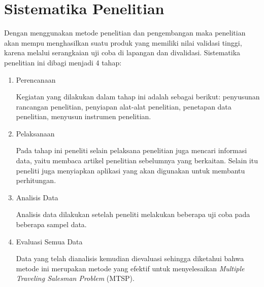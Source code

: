 \section{Sistematika Penelitian}

Dengan menggunakan metode penelitian dan pengembangan maka penelitian akan mempu menghasilkan suatu produk yang memiliki nilai validasi tinggi, karena melalui serangkaian uji coba di lapangan dan divalidasi. Sistematika penelitian ini dibagi menjadi 4 tahap:

\begin{enumerate}

	\item Perencanaan
	
	Kegiatan yang dilakukan dalam tahap ini adalah sebagai berikut: penyusunan rancangan penelitian, penyiapan alat-alat penelitian, penetapan data penelitian, menyusun instrumen penelitian.
	
	\item Pelaksanaan
	
	Pada tahap ini peneliti selain pelaksana penelitian  juga mencari informasi data, yaitu membaca artikel penelitian sebelumnya yang berkaitan. Selain itu peneliti juga menyiapkan aplikasi yang akan digunakan untuk membantu perhitungan.
	
	\item Analisis Data
	
	Analisis data dilakukan setelah peneliti melakukan beberapa uji coba pada beberapa sampel data.
	
	\item Evaluasi Semua Data
	
	Data yang telah dianalisis kemudian dievaluasi sehingga diketahui bahwa metode ini merupakan metode yang efektif untuk menyelesaikan \textit{Multiple Traveling Salesman Problem} (MTSP).

\end{enumerate}